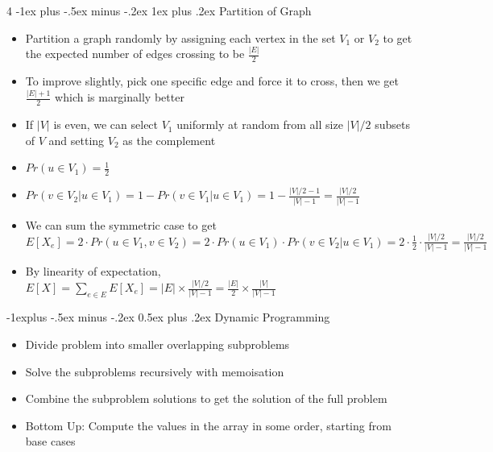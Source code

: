 \documentclass[10pt, landscape]{article}
\makeatletter
\renewcommand{\section}{\@startsection{section}{1}{0mm}%
                                {-1ex plus -.5ex minus -.2ex}%
                                {0.5ex plus .2ex}%
                                {\normalfont\large\bfseries}}
\renewcommand{\section}{\@startsection{section}{2}{0mm}%
                                {-1explus -.5ex minus -.2ex}%
                                {0.5ex plus .2ex}%
                                {\normalfont\normalsize\bfseries}}
\renewcommand{\subsection}{\@startsection{subsection}{3}{0mm}%
                                {-1ex plus -.5ex minus -.2ex}%
                                {1ex plus .2ex}%
                                {\normalfont\small\bfseries}}%
\makeatother
\begin{document}
\begin{multicols*}{4}
\subsection{Partition of Graph}
\begin{itemize}
    \item Partition a graph randomly by assigning each vertex in the set $V_1$ or $V_2$ to get the expected number of edges crossing to be $\frac{|E|}{2}$
    \item To improve slightly, pick one specific edge and force it to cross, then we get $\frac{|E|+1}{2}$ which is marginally better
    \item If $|V|$ is even, we can select $V_1$ uniformly at random from all size $|V|/2$ subsets of $V$ and setting $V_2$ as the complement
    \item $Pr(u \in V_1)=\frac{1}{2}$
    \item $Pr(v \in V_2 | u \in V_1)=1-Pr(v \in V_1 | u \in V_1)=1-\frac{|V|/2-1}{|V|-1}=\frac{|V|/2}{|V|-1}$
    \item We can sum the symmetric case to get $E[X_e]=2\cdot Pr(u \in V_1, v \in V_2)=2\cdot Pr(u \in V_1)\cdot Pr(v \in V_2 | u \in V_1)=2 \cdot \frac{1}{2}\cdot \frac{|V|/2}{|V|-1}=\frac{|V|/2}{|V|-1}$
    \item By linearity of expectation, $E[X]=\sum_{e \in E}E[X_e]=|E| \times\frac{|V|/2}{|V|-1}=\frac{|E|}{2}\times\frac{|V|}{|V|-1}$
\end{itemize}

\section{Dynamic Programming}
\begin{itemize}
    \item Divide problem into smaller overlapping subproblems
    \item Solve the subproblems recursively with memoisation
    \item Combine the subproblem solutions to get the solution of the full problem
    \item Bottom Up: Compute the values in the array in some order, starting from base cases
\end{itemize}


\end{multicols*}
\end{document}
